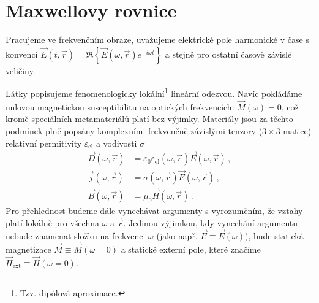 \section{Maxwellovy rovnice}
\label{chap:maxwellovy-rovnice}

Pracujeme ve frekvenčním obraze, uvažujeme elektrické pole harmonické v čase s konvencí $\vec{E}(t,\vec{r})=\Re\left\lbrace\vec{E}(\omega,\vec{r}) e^{-i\omega t}\right\rbrace$ a stejně pro ostatní časově závislé veličiny.

Látky popisujeme fenomenologicky lokální\footnote{Tzv. dipólová aproximace.} lineární odezvou.
Navíc pokládáme nulovou magnetickou susceptibilitu na optických frekvencích: $\vec{M}(\omega)=0$, což kromě speciálních metamateriálů platí bez výjimky.
Materiály jsou za těchto podmínek plně popsány komplexními frekvenčně závislými tenzory ($3\times 3$ matice) relativní permitivity $\varepsilon_{\textrm{el}}$ a vodivosti $\sigma$
\begin{align}
    \vec{D}(\omega,\vec{r})&=\varepsilon_0 \varepsilon_{\textrm{el}}(\omega,\vec{r})\vec{E}(\omega,\vec{r}) \,, \label{eqn:materialy-D} \\
    \vec{j}(\omega,\vec{r})&=\sigma(\omega,\vec{r})\vec{E}(\omega,\vec{r}) \,, \label{eqn:materialy-J} \\
    \vec{B}(\omega,\vec{r})&=\mu_0 \vec{H}(\omega,\vec{r})  \,. \label{eqn:materialy-B}
\end{align}
Pro přehlednost budeme dále vynechávat argumenty s vyrozuměním, že vztahy platí lokálně pro všechna $\omega$ a $\vec{r}$.
Jedinou výjimkou, kdy vynechání argumentu nebude znamenat složku na frekvenci $\omega$ (jako např. $\vec{E}\equiv\vec{E}(\omega)$), bude statická magnetizace $\vec{M}\equiv\vec{M}(\omega=0)$ a statické externí pole, které značíme $\vec{H}_{\textrm{ext}}\equiv\vec{H}(\omega=0)$.

